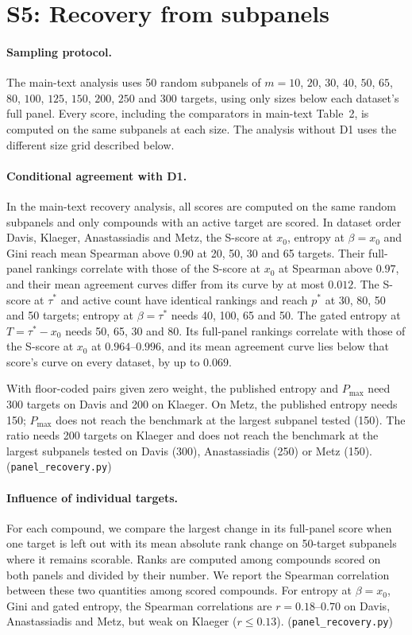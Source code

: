 \documentclass[11pt]{article}
\begin{document}
\clearpage
\section*{S5: Recovery from subpanels}

\paragraph{Sampling protocol.} The main-text analysis uses 50 random
subpanels of $m = 10$, $20$, $30$, $40$, $50$, $65$, $80$, $100$, $125$,
$150$, $200$, $250$ and $300$ targets, using only sizes below each dataset's
full panel. Every score, including the comparators in main-text Table~2,
is computed on the same subpanels at each size. The analysis without D1
uses the different size grid described below.

\paragraph{Conditional agreement with D1.} In the main-text recovery analysis,
all scores are computed on the same random subpanels and only compounds with
an active target are scored. In dataset order Davis, Klaeger, Anastassiadis
and Metz, the S-score at $x_0$, entropy at $\beta = x_0$ and Gini reach mean
Spearman above $0.90$ at 20, 50, 30 and 65 targets. Their full-panel rankings
correlate with those of the S-score at $x_0$ at Spearman above $0.97$, and
their mean agreement curves differ from its curve by at most $0.012$.
The S-score at $\tau^*$ and active count have identical rankings and reach
$p^*$ at 30, 80, 50 and 50 targets; entropy at $\beta = \tau^*$ needs 40, 100,
65 and 50. The gated entropy at $T = \tau^* - x_0$ needs 50, 65, 30 and 80.
Its full-panel rankings correlate with those of the S-score at $x_0$ at
$0.964$--$0.996$, and its mean agreement curve lies below that score's curve
on every dataset, by up to $0.069$.

With floor-coded pairs given zero weight, the published entropy and
$P_{\max}$ need 300 targets on Davis and 200 on Klaeger. On Metz, the
published entropy needs 150; $P_{\max}$ does not reach the benchmark at the
largest subpanel tested (150). The ratio needs 200 targets on Klaeger and
does not reach the benchmark at the largest subpanels tested on Davis
(300), Anastassiadis (250) or Metz (150).
(\texttt{panel\_recovery.py})

\paragraph{Influence of individual targets.} For each compound, we compare
the largest change in its full-panel score when one target is left out with
its mean absolute rank change on 50-target subpanels where it remains
scorable. Ranks are computed among compounds scored on both panels and
divided by their number. We report the Spearman correlation between these
two quantities among scored compounds. For entropy at $\beta = x_0$, Gini and gated entropy,
the Spearman correlations are $r = 0.18$--$0.70$ on Davis, Anastassiadis and
Metz, but weak on Klaeger ($r \leq 0.13$).
(\texttt{panel\_recovery.py})
\end{document}
